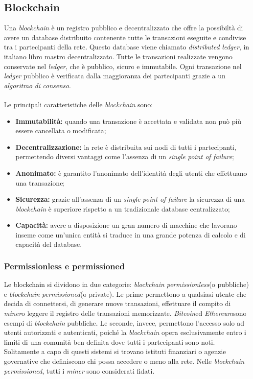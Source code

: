 \subsection{Blockchain}
Una \textit{blockchain} è un registro pubblico e decentralizzato che offre la possibiltà di avere un database distribuito contenente tutte le transazioni eseguite e condivise tra i partecipanti della rete. Questo database viene chiamato \emph{\gls{distributed ledger}}\glsfirstoccur, in italiano libro mastro decentralizzato.
Tutte le transazioni realizzate vengono conservate nel \textit{ledger}, che è pubblico, sicuro e immutabile. Ogni transazione nel \textit{ledger} pubblico è verificata dalla maggioranza dei partecipanti grazie a un \emph{\gls{algoritmo di consenso}}\glsfirstoccur.\\\\ Le principali caratteristiche delle \textit{blockchain} sono:
\begin{itemize}
	\item{\textbf{Immutabilità: } quando una transazione è accettata e validata non può più essere cancellata o modificata;}
	\item{\textbf{Decentralizzazione: }la rete è distribuita sui nodi di tutti i partecipanti, permettendo diversi vantaggi come l'assenza di un \emph{single point of failure}\glsfirstoccur;}
	\item{\textbf{Anonimato: }è garantito l'anonimato dell'identità degli utenti che effettuano una transazione;}
	\item{\textbf{Sicurezza: }grazie all'assenza di un \textit{single point of failure} la sicurezza di una \textit{blockchain} è superiore rispetto a un tradizionale database centralizzato;}
	\item{\textbf{Capacità: }avere a disposizione un gran numero di macchine che lavorano inseme come un'unica entità si traduce in una grande potenza di calcolo e di capacità del database.}
\end{itemize}

\subsubsection{Permissionless e permissioned}
Le blockchain si dividono in due categorie: \textit{blockchain} \emph{\gls{permissionless}}\glsfirstoccur (o pubbliche) e \textit{blockchain} \emph{\gls{permissioned}}\glsfirstoccur (o private). Le prime permettono a qualsiasi utente che decida di connettersi, di generare nuove transazioni, effettuare il compito di \emph{\gls{miner}}\glsfirstoccur o leggere il registro delle transazioni memorizzate. \emph{\gls{Bitcoin}}\glsfirstoccur ed \textit{Ethereum}\glsfirstoccur sono esempi di \textit{blockchain} pubbliche.
Le seconde, invece, permettono l’accesso solo ad utenti autorizzati e autenticati, poiché la \textit{blockchain} opera esclusivamente entro i limiti di una comunità ben definita dove tutti i partecipanti sono noti. Solitamente a capo di questi sistemi si trovano istituti finanziari o agenzie governative che definiscono chi possa accedere o meno alla rete. Nelle \textit{blockchain permissioned}, tutti i \textit{miner} sono considerati fidati.

